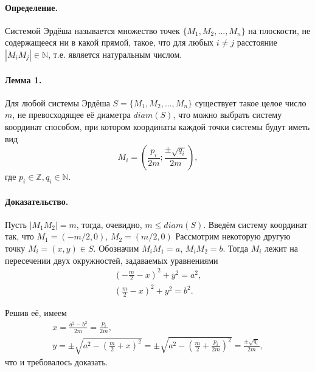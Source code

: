 \documentclass[a4paper,14pt]{article} %
\begin{document}
\renewcommand{\bibname}{Список цитированной литературы}
\renewcommand\refname{\bibname}

\paragraph{Определение.}
Системой Эрдёша называется множество точек $\{M_1, M_2, ..., M_n\}$ на плоскости, не содержащееся ни в какой прямой,
такое, что для любых $i\neq j$ расстояние $|M_i M_j| \in \mathbb{N}$,
т.е. является натуральным числом.

\paragraph{Лемма 1.}

Для любой системы Эрдёша $S=\{M_1, M_2, ..., M_n\}$ существует такое целое число $m$, не превосходящее её диаметра $diam(S)$,
что можно выбрать систему координат способом, при котором координаты каждой точки системы будут иметь вид
\begin{equation}
	M_i = \left(
		\frac{p_i}{2m}
		;
		\frac{\pm\sqrt{q_i}}{2m}
	\right),
\end{equation}
где $p_i \in \mathbb{Z}, q_i \in \mathbb{N}$.


\paragraph{Доказательство.}
Пусть $|M_1 M_2| = m$, тогда, очевидно, $m \leq diam(S)$.
Введём систему координат так, что $M_1=(-m/2, 0)$, $M_2=(m/2, 0)$
Рассмотрим некоторую другую точку $M_i=(x, y)\in S$.
Обозначим $M_i M_1 = a$, $M_i M_2 = b$.
Тогда $M_i$ лежит на пересечении двух окружностей,
задаваемых уравнениями
\begin{gather}
	\left(-\frac{m}{2} - x\right)^2 + y ^2 = a^2,
\\
	\left( \frac{m}{2} - x\right)^2 + y ^2 = b^2.
\end{gather}

Решив её, имеем
\begin{gather}
	x = \frac{a^2 - b^2}{2 m} = \frac{p_i}{2m},
\\
	y = \pm\sqrt{a^2 - \left(\frac{m}{2}+x\right)^2} =
	\pm\sqrt{a^2 - \left(\frac{m}{2}+\frac{p_i}{2m}\right)^2} =
	\frac{\pm\sqrt{q_i}}{2m},
\end{gather}
что и требовалось доказать.
\end{document}
